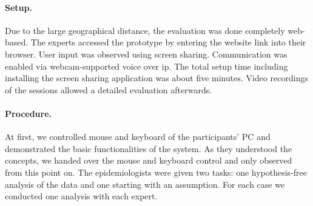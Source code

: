 \documentclass[journal]{style/vgtc} 			          %
\begin{document}
\paragraph{Setup.} Due to the large geographical distance, the evaluation was done completely web-based.
%
The experts accessed the prototype by entering the website link into their browser. %
%
%
User input was observed using screen sharing.
%
Communication was enabled via webcam-supported voice over ip.
%
The total setup time including installing the screen sharing application was about five minutes.
%
Video recordings of the sessions allowed a detailed evaluation afterwards.%
%
\paragraph{Procedure.}
At first, we controlled mouse and keyboard of the participants' PC and demonstrated the basic functionalities of the system.
%
%
As they understood the concepts, we handed over the mouse and keyboard control and only observed from this point on.
%
The epidemiologists were given two tasks: one hypothesis-free analysis of the data and one starting with an assumption.
%
For each case we conducted one analysis with each expert.

\end{document}

